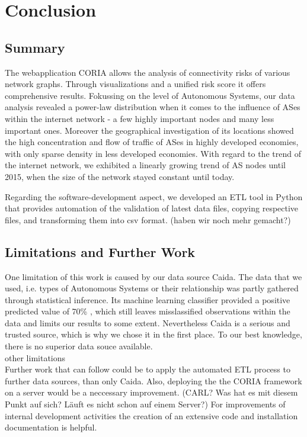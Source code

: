 \documentclass[conference, 11pt]{IEEEtran}
\begin{document}
\section{Conclusion}
\subsection{Summary}

The webapplication CORIA allows the analysis of connectivity risks of various network graphs. Through visualizations and a unified risk score it offers comprehensive results. Fokussing on the level of Autonomous Systems, our data analysis revealed a power-law distribution when it comes to the influence of ASes within the internet network - a few highly important nodes and many less important ones. Moreover the geographical investigation of its locations showed the high concentration and flow of traffic of ASes in highly developed economies, with only sparse density in less developed economies. With regard to the trend of the internet network, we exhibited a linearly growing trend of AS nodes until 2015, when the size of the network stayed constant until today.

Regarding the software-development aspect, we developed an ETL tool in Python that provides automation of the validation of latest data files, copying respective files, and transforming them into csv format.  (haben wir noch mehr gemacht?)

 

\subsection{Limitations and Further Work}

 
One limitation of this work is caused by our data source Caida. The data that we used, i.e. types of Autonomous Systems or their relationship was partly gathered through statistical inference. Its machine learning classifier provided a positive predicted value of 70\% \cite{Classification}, which still leaves misslassified observations within the data and limits our results to some extent. Nevertheless Caida is a serious and trusted source, which is why we chose it in the first place. To our best knowledge, there is no superior data souce available.  \\ 

other limitations\\



Further work that can follow could be to apply the automated ETL process to further data sources, than only Caida. Also, deploying the the CORIA framework on a server would be a neccessary improvement. (CARL? Was hat es mit diesem Punkt auf sich? Läuft es nicht schon auf einem Server?) For improvements of internal development activities the creation of an extensive code and installation documentation is helpful.
\end{document}
